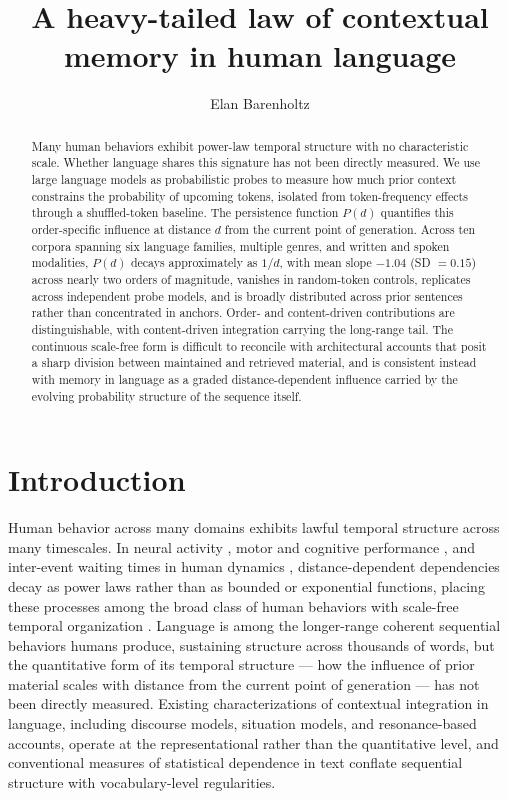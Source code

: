 \documentclass[11pt]{article}
\title{\bfseries A heavy-tailed law of contextual memory in human language}
\author[1]{Elan Barenholtz}
\affil[1]{Center for the Future Mind, Florida Atlantic University}
\date{}
\begin{document}
\maketitle

\begin{abstract}
\noindent
Many human behaviors exhibit power-law temporal structure with no characteristic
scale. Whether language shares this signature has not been directly measured. We
use large language models as probabilistic probes to measure how much prior
context constrains the probability of upcoming tokens, isolated from
token-frequency effects through a shuffled-token baseline. The persistence
function $P(d)$ quantifies this order-specific influence at distance $d$ from the
current point of generation. Across ten corpora spanning six language families,
multiple genres, and written and spoken modalities, $P(d)$ decays approximately
as $1/d$, with mean slope $-1.04$ (SD $=0.15$) across nearly two orders of
magnitude, vanishes in random-token controls, replicates across independent probe
models, and is broadly distributed across prior sentences rather than concentrated
in anchors. Order- and content-driven contributions are distinguishable, with
content-driven integration carrying the long-range tail. The continuous scale-free
form is difficult to reconcile with architectural accounts that posit a sharp
division between maintained and retrieved material, and is consistent instead with
memory in language as a graded distance-dependent influence carried by the evolving
probability structure of the sequence itself.
\end{abstract}

\section{Introduction}

Human behavior across many domains exhibits lawful temporal structure across many
timescales. In neural activity \citep{beggs2003neuronal}, motor and cognitive
performance \citep{gilden2001cognitive}, and inter-event waiting times in human
dynamics \citep{barabasi2005origin}, distance-dependent dependencies decay as power
laws rather than as bounded or exponential functions, placing these processes among
the broad class of human behaviors with scale-free temporal organization
\citep{kello2010scaling}. Language is among the longer-range coherent sequential
behaviors humans produce, sustaining structure across thousands of words, but the
quantitative form of its temporal structure --- how the influence of prior material
scales with distance from the current point of generation --- has not been directly
measured. Existing characterizations of contextual integration in language,
including discourse models, situation models, and resonance-based accounts, operate
at the representational rather than the quantitative level, and conventional measures
of statistical dependence in text conflate sequential structure with vocabulary-level
regularities.
\end{document}
